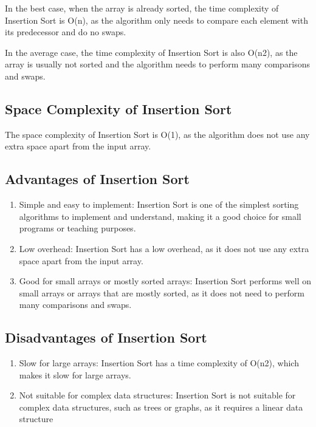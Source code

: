 \documentclass[a4paper, 11pt, oneside]{book} %
\begin{document}
In the best case, when the array is already sorted, the time complexity of Insertion Sort is O(n), as the algorithm only needs to compare each element with its predecessor and do no swaps.

In the average case, the time complexity of Insertion Sort is also O(n2), as the array is usually not sorted and the algorithm needs to perform many comparisons and swaps.

\subsection{Space Complexity of Insertion Sort}

The space complexity of Insertion Sort is O(1), as the algorithm does not use any extra space apart from the input array.

\subsection{Advantages of Insertion Sort}

\begin{enumerate}
  \item Simple and easy to implement: Insertion Sort is one of the simplest sorting algorithms to implement and understand, making it a good choice for small programs or teaching purposes.
  \item Low overhead: Insertion Sort has a low overhead, as it does not use any extra space apart from the input array.
  \item Good for small arrays or mostly sorted arrays: Insertion Sort performs well on small arrays or arrays that are mostly sorted, as it does not need to perform many comparisons and swaps.
\end{enumerate}

\subsection{Disadvantages of Insertion Sort}
\begin{enumerate}
  \item Slow for large arrays: Insertion Sort has a time complexity of O(n2), which makes it slow for large arrays.
  \item Not suitable for complex data structures: Insertion Sort is not suitable for complex data structures, such as trees or graphs, as it requires a linear data structure
\end{enumerate}
\end{document}
